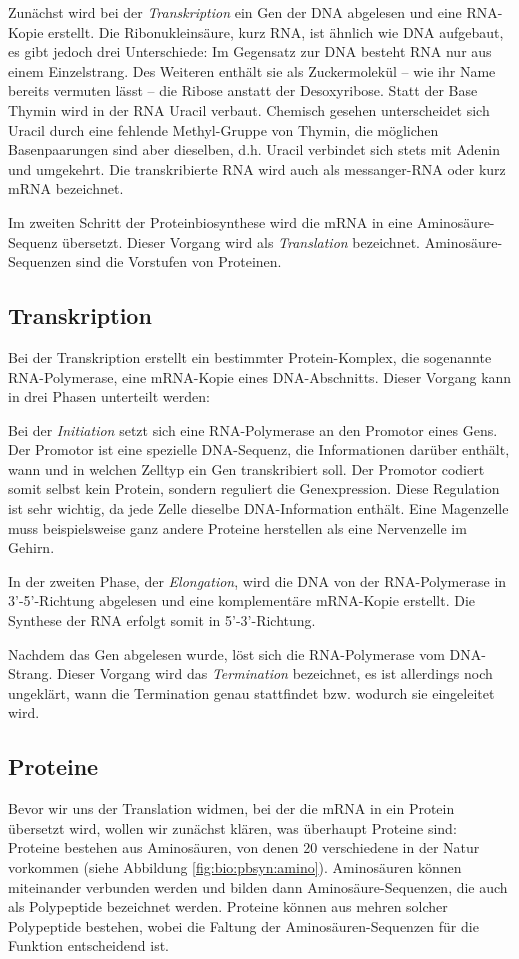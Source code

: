 Zunächst wird bei der \emph{Transkription} ein Gen der DNA abgelesen und eine RNA-Kopie erstellt. Die Ribonukleinsäure, kurz RNA, ist ähnlich wie DNA aufgebaut, es gibt jedoch drei Unterschiede: Im Gegensatz zur DNA besteht RNA nur aus einem Einzelstrang. Des Weiteren enthält sie als Zuckermolekül -- wie ihr Name bereits vermuten lässt -- die Ribose anstatt der Desoxyribose. Statt der Base Thymin wird in der RNA Uracil verbaut. Chemisch gesehen unterscheidet sich Uracil durch eine fehlende Methyl-Gruppe von Thymin, die möglichen Basenpaarungen sind aber dieselben, d.h. Uracil verbindet sich stets mit Adenin und umgekehrt. Die transkribierte RNA wird auch als messanger-RNA oder kurz mRNA bezeichnet.

Im zweiten Schritt der Proteinbiosynthese wird die mRNA in eine Aminosäure-Sequenz übersetzt. Dieser Vorgang wird als \emph{Translation} bezeichnet. Aminosäure-Sequenzen sind die Vorstufen von Proteinen. 


\subsection{Transkription}
\label{sec:bio:pbsyn:transkription}


Bei der Transkription erstellt ein bestimmter Protein-Komplex, die sogenannte  RNA-Polymerase, eine mRNA-Kopie eines DNA-Abschnitts. Dieser Vorgang kann in drei Phasen unterteilt werden:

Bei der \emph{Initiation} setzt sich eine RNA-Polymerase an den Promotor eines Gens. Der Promotor ist eine spezielle DNA-Sequenz, die Informationen darüber enthält, wann und in welchen Zelltyp ein Gen transkribiert soll. Der Promotor codiert somit selbst kein Protein, sondern reguliert die Genexpression. Diese Regulation ist sehr wichtig, da jede Zelle dieselbe DNA-Information enthält. Eine Magenzelle muss beispielsweise ganz andere Proteine herstellen als eine Nervenzelle im Gehirn.

In der zweiten Phase, der \emph{Elongation}, wird die DNA von der RNA-Polymerase in 3'-5'-Richtung abgelesen und eine komplementäre mRNA-Kopie erstellt. Die Synthese der RNA erfolgt somit in 5'-3'-Richtung. 

Nachdem das Gen abgelesen wurde, löst sich die RNA-Polymerase vom DNA-Strang. Dieser Vorgang wird das \emph{Termination} bezeichnet, es ist allerdings noch ungeklärt, wann die Termination genau stattfindet bzw. wodurch sie eingeleitet wird. 


\subsection{Proteine}
\label{sec:bio:pbsyn:proteine}
Bevor wir uns der Translation widmen, bei der die mRNA in ein Protein übersetzt wird, wollen wir zunächst klären, was überhaupt Proteine sind: Proteine bestehen aus Aminosäuren, von denen 20 verschiedene in der Natur vorkommen (siehe Abbildung \ref{fig:bio:pbsyn:amino}). Aminosäuren können miteinander verbunden werden und bilden dann Aminosäure-Sequenzen, die auch als Polypeptide bezeichnet werden. Proteine können aus mehren solcher Polypeptide bestehen, wobei die Faltung der Aminosäuren-Sequenzen für die Funktion entscheidend ist.

